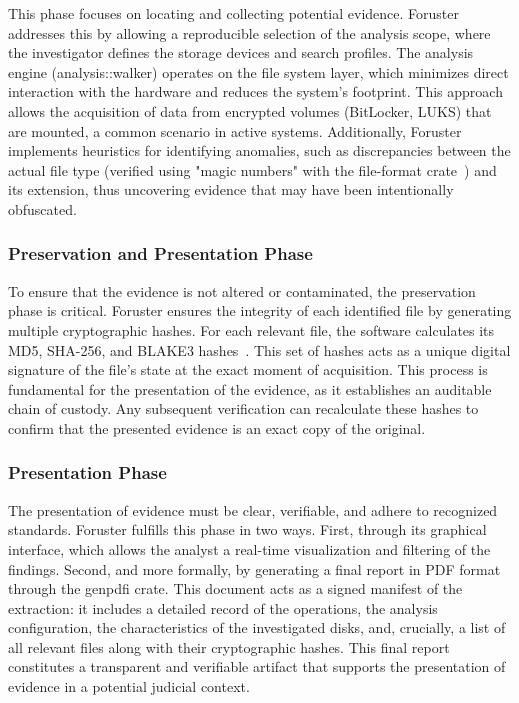 \documentclass[preprint,12pt,a4paper]{elsarticle}
\begin{document}
This phase focuses on locating and collecting potential evidence. Foruster addresses this by allowing a reproducible selection of the analysis scope, where the investigator defines the storage devices and search profiles. The analysis engine (analysis::walker) operates on the file system layer, which minimizes direct interaction with the hardware and reduces the system’s footprint. This approach allows the acquisition of data from encrypted volumes (BitLocker, LUKS) that are mounted, a common scenario in active systems. Additionally, Foruster implements heuristics for identifying anomalies, such as discrepancies between the actual file type (verified using "magic numbers" with the file-format crate~\cite{carrier2005file}) and its extension, thus uncovering evidence that may have been intentionally obfuscated.

\subsubsection{Preservation and Presentation Phase}

To ensure that the evidence is not altered or contaminated, the preservation phase is critical. Foruster ensures the integrity of each identified file by generating multiple cryptographic hashes. For each relevant file, the software calculates its MD5, SHA-256, and BLAKE3 hashes~\cite{aumasson2020blake3}. This set of hashes acts as a unique digital signature of the file’s state at the exact moment of acquisition. This process is fundamental for the presentation of the evidence, as it establishes an auditable chain of custody. Any subsequent verification can recalculate these hashes to confirm that the presented evidence is an exact copy of the original.

\subsubsection{Presentation Phase}

The presentation of evidence must be clear, verifiable, and adhere to recognized standards. Foruster fulfills this phase in two ways. First, through its graphical interface, which allows the analyst a real-time visualization and filtering of the findings. Second, and more formally, by generating a final report in PDF format through the genpdfi crate. This document acts as a signed manifest of the extraction: it includes a detailed record of the operations, the analysis configuration, the characteristics of the investigated disks, and, crucially, a list of all relevant files along with their cryptographic hashes. This final report constitutes a transparent and verifiable artifact that supports the presentation of evidence in a potential judicial context.
\end{document}

